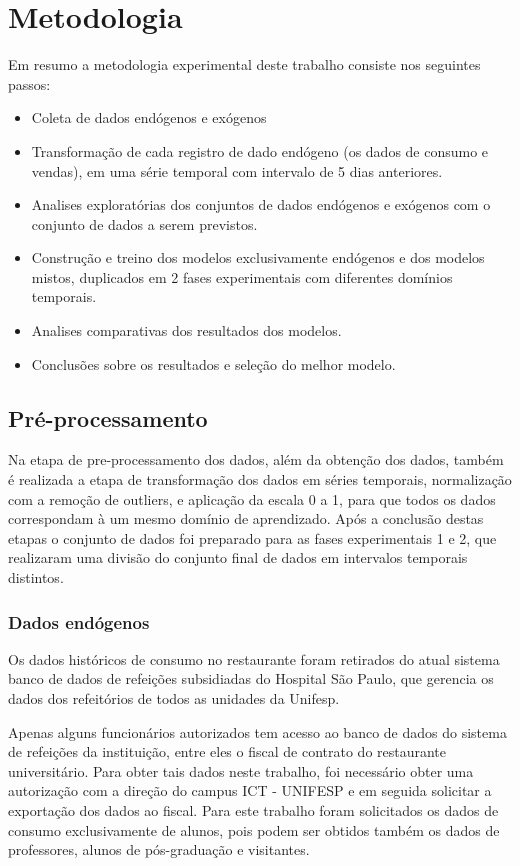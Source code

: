 
\chapter{Metodologia} \label{cap:metodos}
    Em resumo a metodologia experimental deste trabalho consiste nos seguintes passos:
    \begin{itemize}
        \item Coleta de dados endógenos e exógenos
        \item Transformação de cada registro de dado endógeno (os dados de consumo e vendas), em uma série temporal com intervalo de 5 dias anteriores.
        \item Analises exploratórias dos conjuntos de dados endógenos e exógenos com o conjunto de dados a serem previstos.
        \item Construção e treino dos modelos exclusivamente endógenos e dos modelos mistos, duplicados em 2 fases experimentais com diferentes domínios temporais.
        \item Analises comparativas dos resultados dos modelos.
        \item Conclusões sobre os resultados e seleção do melhor modelo.
    \end{itemize}
    
	\section{Pré-processamento}
	    Na etapa de pre-processamento dos dados, além da obtenção dos dados, também é realizada a etapa de transformação dos dados em séries temporais, normalização com a remoção de outliers, e aplicação da escala 0 a 1, para que todos os dados correspondam à um mesmo domínio de aprendizado.
	    Após a conclusão destas etapas o conjunto de dados foi preparado para as fases experimentais 1 e 2, que realizaram uma divisão do conjunto final de dados em intervalos temporais distintos.
	    
	    \subsection{Dados endógenos}
        	Os dados históricos de consumo no restaurante foram retirados do atual sistema banco de dados de refeições subsidiadas do Hospital São Paulo, que gerencia os dados dos refeitórios de todos as unidades da Unifesp.
        	
        	Apenas alguns funcionários autorizados tem acesso ao banco de dados do sistema de refeições da instituição, entre eles o fiscal de contrato do restaurante universitário. Para obter tais dados neste trabalho, foi necessário obter uma autorização com a direção do campus ICT - UNIFESP e em seguida solicitar a exportação dos dados ao fiscal. Para este trabalho foram solicitados os dados de consumo exclusivamente de alunos, pois podem ser obtidos também os dados de professores, alunos de pós-graduação e visitantes. 
    
